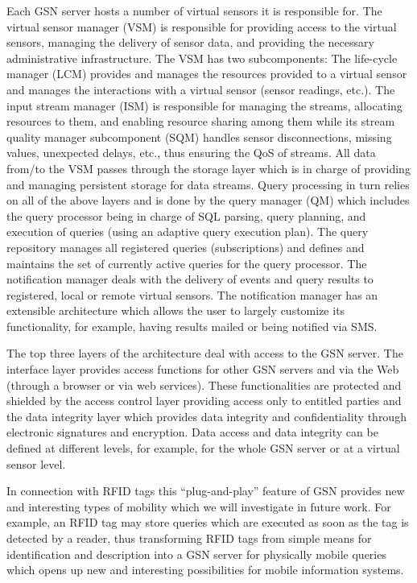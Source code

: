 Each GSN server hosts a number of virtual sensors it is responsible
for. The virtual sensor manager (VSM) is responsible for providing
access to the virtual sensors, managing the delivery of sensor data,
and providing the necessary administrative infrastructure. The VSM has
two subcomponents: The life-cycle manager (LCM) provides and manages
the resources provided to a virtual sensor and manages the
interactions with a virtual sensor (sensor readings, etc.). The input
stream manager (ISM) is responsible for managing the streams,
allocating resources to them, and enabling resource sharing among them
while its stream quality manager subcomponent (SQM) handles sensor
disconnections, missing values, unexpected delays, etc., thus ensuring
the QoS of streams. All data from/to the VSM passes through the
storage layer which is in charge of providing and managing persistent
storage for data streams. Query processing in turn relies on all of
the above layers and is done by the query manager (QM) which includes
the query processor being in charge of SQL parsing, query planning,
and execution of queries (using an adaptive query execution plan). The
query repository manages all registered queries (subscriptions) and
defines and maintains the set of currently active queries for the
query processor.  The notification manager deals with the delivery of
events and query results to registered, local or remote virtual sensors. The
notification manager has an extensible architecture which allows the
user to largely customize its functionality, for example, having
results mailed or being notified via SMS.

The top three layers of the architecture deal with access to the GSN
server. The interface layer provides access functions for other GSN
servers and via the Web (through a browser or via web services).
These functionalities are protected and shielded by the access control
layer providing access only to entitled parties and the data integrity
layer which provides data integrity and confidentiality through
electronic signatures and encryption. Data access and data integrity
can be defined at different levels, for example, for the whole GSN
server or at a virtual sensor level.

In connection with RFID tags this ``plug-and-play'' feature of GSN
provides new and interesting types of mobility which we will
investigate in future work. For example, an RFID tag may store queries
which are executed as soon as the tag is detected by a reader, thus
transforming RFID tags from simple means for identification and
description into a GSN server for physically mobile queries which opens
up new and interesting possibilities for mobile information systems.

